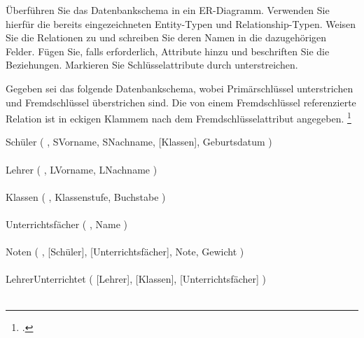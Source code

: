 \documentclass{bschlangaul-aufgabe}
\begin{document}

Überführen Sie das Datenbankschema in ein
ER-Diagramm. Verwenden Sie hierfür die
bereits eingezeichneten Entity-Typen und Relationship-Typen. Weisen Sie
die Relationen zu und schreiben Sie deren Namen
in die dazugehörigen Felder. Fügen Sie, falls erforderlich, Attribute
hinzu und beschriften Sie die Beziehungen. Markieren Sie
Schlüsselattribute durch unterstreichen.

Gegeben sei das folgende Datenbankschema, wobei Primärschlüssel
unterstrichen und Fremdschlüssel überstrichen sind. Die von einem
Fremdschlüssel referenzierte Relation ist in eckigen Klammem nach dem
Fremdschlüsselattribut angegeben.
\footcite[Aufgabe 1]{db:pu:wh}

\bigskip

{
  \noindent
  \ttfamily
  \footnotesize
  Schüler (%
    ,
    SVorname,
    SNachname,
    [Klassen],
    Geburtsdatum%
  )\\\\
  Lehrer (%
    ,
    LVorname,
    LNachname%
  )\\\\
  Klassen (%
    ,
    Klassenstufe,
    Buchstabe%
  )\\\\
  Unterrichtsfächer (%
    ,
    Name%
  )\\\\
  Noten (%
    ,
    [Schüler],
    [Unterrichtsfächer],
    Note,
    Gewicht%
  )\\\\
  LehrerUnterrichtet (%
    [Lehrer],
    [Klassen],
    [Unterrichtsfächer]%
  )\\\\
}
\end{document}
